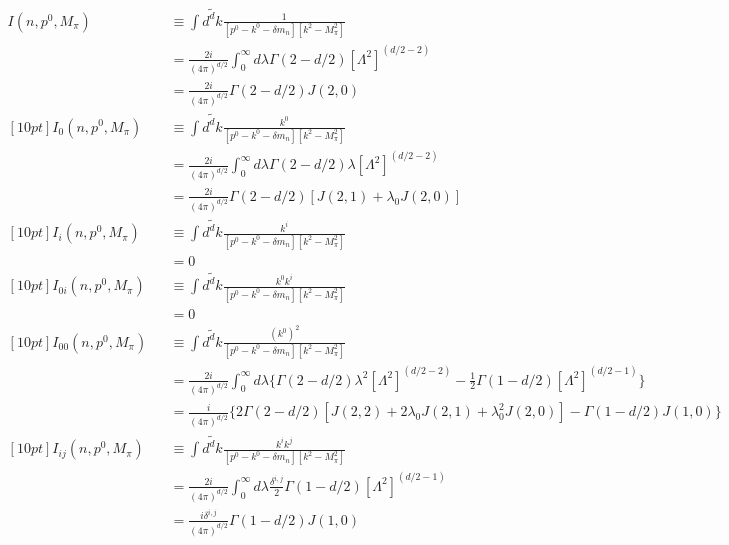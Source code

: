 \documentclass{article}
\newcommand{\bea}{\begin{eqnarray}}
\newcommand{\eea}{\end{eqnarray}}
\begin{document}
\bea
I \left( n,p^0,M_\pi \right) && \equiv  \int \tilde{d^dk} \frac{  1  }{ \left[ p^0 -k^0 -\delta m_n \right] \left[k^2-M_\pi^2 \right] }
\nonumber\\
&& =\frac{2i}{ \left( 4\pi \right)^{d/2} }  \int_{0}^{\infty}d\lambda      \Gamma \left( 2-d/2 \right) \left[ \Lambda^2 \right]^{(d/2-2)}
\nonumber\\
&& =\frac{2i}{ \left( 4\pi \right)^{d/2} }    \Gamma \left( 2-d/2 \right) J \left( 2,0 \right)
\nonumber\\	[10pt]	
I_{0} \left( n,p^0,M_\pi \right) && \equiv  \int \tilde{d^dk} \frac{  k^0  }{ \left[ p^0 -k^0 -\delta m_n \right] \left[k^2-M_\pi^2 \right] }
\nonumber\\
&& =\frac{2i}{ \left( 4\pi \right)^{d/2} }  \int_{0}^{\infty}d\lambda     \Gamma \left( 2-d/2 \right)\lambda\left[ \Lambda^2 \right]^{(d/2-2)}
\nonumber\\
&& =\frac{2i}{ \left( 4\pi \right)^{d/2} }    \Gamma \left( 2-d/2 \right)  \left[ J\left(2,1\right)+ \lambda_0 J\left(2,0\right) \right]
\nonumber\\	[10pt]
I_{i} \left( n,p^0,M_\pi \right) && \equiv  \int \tilde{d^dk} \frac{  k^i  }{ \left[ p^0 -k^0 -\delta m_n \right] \left[k^2-M_\pi^2 \right] }
\nonumber\\
&& =0
\nonumber\\ [10pt]
I_{0i} \left( n,p^0,M_\pi \right) && \equiv  \int \tilde{d^dk} \frac{ k^0 k^i  }{ \left[ p^0 -k^0 -\delta m_n \right] \left[k^2-M_\pi^2 \right] }
\nonumber\\
&& =0
\nonumber\\ [10pt]
I_{00} \left( n,p^0,M_\pi \right) && \equiv  \int \tilde{d^dk} \frac{ (k^0)^2  }{ \left[ p^0 -k^0 -\delta m_n \right] \left[k^2-M_\pi^2 \right] }
\nonumber\\
&& = \frac{2i}{ \left( 4\pi \right)^{d/2} }  \int_{0}^{\infty}d\lambda   \{\Gamma \left( 2-d/2 \right)\lambda^2 \left[ \Lambda^2 \right]^{(d/2-2)} - \frac{1}{2} \Gamma \left( 1-d/2 \right) \left[ \Lambda^2 \right]^{(d/2-1)} \}
\nonumber\\
&& =\frac{i}{ \left( 4\pi \right)^{d/2} }   \{ 2 \Gamma \left( 2-d/2 \right)  \left[ J\left(2,2\right)+  2\lambda_0 J\left(2,1\right)  +\lambda_0^2 J\left(2,0\right) \right] -\Gamma \left( 1-d/2 \right) J\left(1,0\right) \}
\nonumber\\	[10pt]
I_{ij} \left( n,p^0,M_\pi \right) && \equiv  \int \tilde{d^dk} \frac{ k^i k^j  }{ \left[ p^0 -k^0 -\delta m_n \right] \left[k^2-M_\pi^2 \right] }
\nonumber\\
&& = \frac{2i}{ \left( 4\pi \right)^{d/2} }  \int_{0}^{\infty}d\lambda  \frac{\delta^{i,j}}{2} \Gamma \left(1-d/2 \right) \left[ \Lambda^2 \right]^{(d/2-1)}
\nonumber \\
&& = \frac{i \delta^{i,j}}{ \left( 4\pi \right)^{d/2} }  \Gamma \left(1-d/2 \right) J\left(1,0\right)
\nonumber 
\eea
\end{document}
